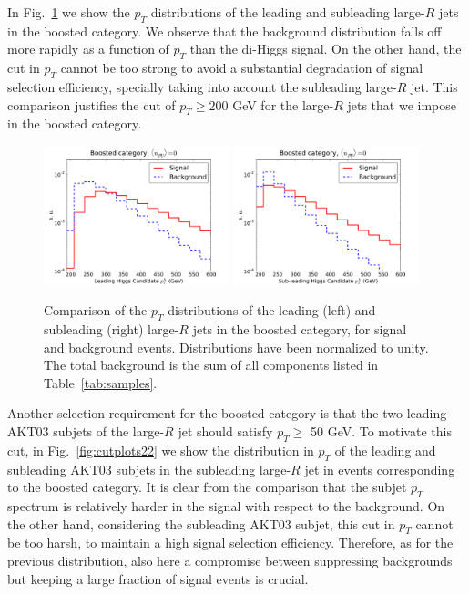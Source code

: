 In Fig.~\ref{fig:cutplots1} we show
the $p_T$ distributions
of the
  leading and subleading large-$R$ jets in the boosted category.
  We observe that the background distribution
falls off more rapidly as a function of $p_T$ than the di-Higgs signal.
  On the other hand, the cut in $p_T$ cannot be too strong to avoid
  a substantial degradation of signal selection efficiency,
  specially taking into account the subleading large-$R$ jet.
  This comparison justifies the cut of $p_T \ge 200$ GeV
  for the large-$R$ jets that we impose in the boosted category.
  

\begin{figure}[t]
\begin{center}
 \includegraphics[width=0.48\textwidth]{plots/pt_H0_bst_C1d_noPU.pdf}
 \includegraphics[width=0.48\textwidth]{plots/pt_H1_bst_C1d_noPU.pdf}
\caption{\small  Comparison of the $p_T$ distributions of the
  leading (left) and
  subleading (right) large-$R$ jets in the boosted category,
  for signal and background events.
  Distributions have been normalized to unity.
  The total background is the sum of all components
  listed in Table~\ref{tab:samples}.
}
\label{fig:cutplots1}
\end{center}
\end{figure}


Another selection requirement for the boosted category is that the two
leading AKT03 subjets of the large-$R$ jet
should satisfy $p_T \ge $ 50 GeV.
%
To motivate this cut, in Fig.~\ref{fig:cutplots22}
we show the distribution in $p_T$ of the leading
and subleading AKT03 subjets in the subleading large-$R$ jet in events
corresponding to the boosted category.
%
It is clear from the comparison that the subjet $p_T$ spectrum is
relatively harder in the signal with respect to the background.
%
On the other hand, considering the subleading AKT03 subjet,
this cut in $p_T$
cannot be too harsh, to maintain a high signal selection
efficiency.
%
Therefore,
as for the previous distribution, also here 
a compromise between suppressing backgrounds but keeping a large fraction of
signal events is crucial.


